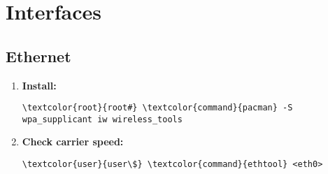 \documentclass[10pt, a4paper, onecolumn, openany]{book} %
\begin{document}
\section{Interfaces}
\subsection{Ethernet}
\begin{enumerate}
    \item \textbf{Install:}
\begin{Verbatim}[commandchars=\\\{\}]
\textcolor{root}{root#} \textcolor{command}{pacman} -S wpa_supplicant iw wireless_tools
\end{Verbatim} 
    \item \textbf{Check carrier speed:}
\begin{Verbatim}[commandchars=\\\{\}]
\textcolor{user}{user\$} \textcolor{command}{ethtool} <eth0>
\end{Verbatim}
\end{enumerate}
\end{document}
